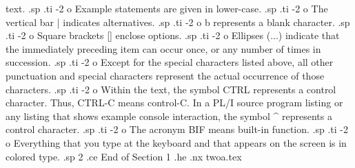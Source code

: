 text.
.sp
.ti -2 
o Example statements are given in lower-case.  
.sp
.ti -2
o The vertical bar | indicates alternatives.
.sp
.ti -2
o b represents a blank character.
.sp
.ti -2
o Square brackets [] enclose options.
.sp
.ti -2
o Ellipses (...) indicate that the immediately preceding item can occur 
once, or any number of times in succession.
.sp
.ti -2
o Except for the special characters listed above, all other 
punctuation and special characters represent the actual occurrence of 
those characters.
.sp
.ti -2
o Within the text, the symbol CTRL represents a control character.  
Thus, CTRL-C means control-C.  In a PL/I source program listing or any 
listing that shows example console interaction, the symbol ^ represents 
a control character.
.sp
.ti -2
o The acronym BIF means built-in function.
.sp
.ti -2
o Everything that you type at the keyboard and that appears 
on the screen is in colored type.
.sp 2
.ce
End of Section 1
.he
.nx twoa.tex


 
